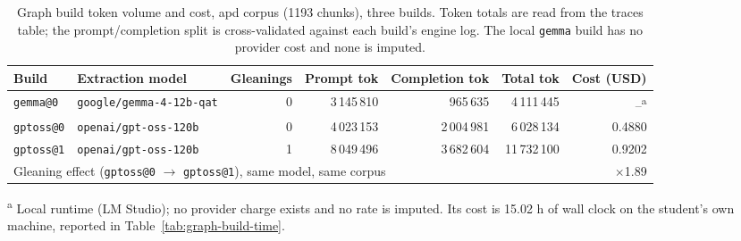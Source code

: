 \begin{table}[htbp]
  \centering
  \caption{Graph build token volume and cost, apd corpus (1193 chunks), three builds. Token totals
    are read from the traces table; the prompt/completion split is cross-validated against each
    build's engine log. The local \texttt{gemma} build has no provider cost and none is imputed.}
  \label{tab:graph-build-cost}
  \small
  \begin{tabular}{llrrrrr}
    \toprule
    Build & Extraction model & Gleanings & Prompt tok & Completion tok & Total tok & Cost (USD) \\
    \midrule
    \texttt{gemma@0}  & \texttt{google/gemma-4-12b-qat} & 0 & 3\,145\,810 & \phantom{0}965\,635 & \phantom{0}4\,111\,445 & --\textsuperscript{a} \\
    \texttt{gptoss@0} & \texttt{openai/gpt-oss-120b}    & 0 & 4\,023\,153 & 2\,004\,981 & \phantom{0}6\,028\,134 & 0.4880 \\
    \texttt{gptoss@1} & \texttt{openai/gpt-oss-120b}    & 1 & 8\,049\,496 & 3\,682\,604 & 11\,732\,100 & 0.9202 \\
    \midrule
    \multicolumn{6}{l}{Gleaning effect (\texttt{gptoss@0} $\rightarrow$ \texttt{gptoss@1}), same model, same corpus} & $\times$1.89 \\
    \bottomrule
  \end{tabular}

  \vspace{0.5em}
  \footnotesize
  \textsuperscript{a} Local runtime (LM Studio); no provider charge exists and no rate is imputed.
  Its cost is 15.02 h of wall clock on the student's own machine, reported in
  Table~\ref{tab:graph-build-time}.
\end{table}
